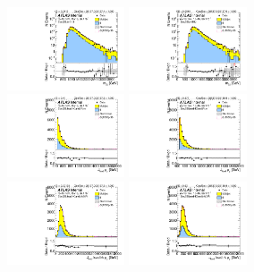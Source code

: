 \begin{figure}[htbp!]
\begin{center}
\includegraphics[width=0.31\textwidth,angle=-90]{figures/boosted/Prereweight/Moriond_TwoTag_split_Sideband_mHH_l_1.pdf}
\includegraphics[width=0.31\textwidth,angle=-90]{figures/boosted/Sideband/b77_TwoTag_split_Sideband_mHH_l_1.pdf}\\
\includegraphics[width=0.31\textwidth,angle=-90]{figures/boosted/Prereweight/Moriond_TwoTag_split_Sideband_leadHCand_Pt_m.pdf}
\includegraphics[width=0.31\textwidth,angle=-90]{figures/boosted/Sideband/b77_TwoTag_split_Sideband_leadHCand_Pt_m.pdf}\\
\includegraphics[width=0.31\textwidth,angle=-90]{figures/boosted/Prereweight/Moriond_TwoTag_split_Sideband_leadHCand_trk0_Pt.pdf}
\includegraphics[width=0.31\textwidth,angle=-90]{figures/boosted/Sideband/b77_TwoTag_split_Sideband_leadHCand_trk0_Pt.pdf}\\

\end{center}
\end{figure}
